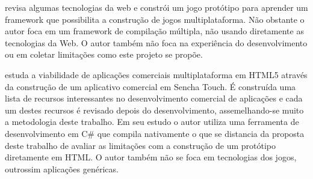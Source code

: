 \citet{crossPlatformMobileGameDevelopment} revisa algumas tecnologias
da web e constrói um jogo protótipo para aprender um framework que
possibilita a construção de jogos multiplataforma. Não obstante
o autor foca em um framework de compilação múltipla, não usando
diretamente as tecnologias da Web. O autor também não foca na experiência do
desenvolvimento ou em coletar limitações como este projeto se propõe.

\citet{viabilityBusinessApplications} estuda a viabilidade de
aplicações comerciais multiplataforma em HTML5 através da
construção de um aplicativo comercial em Sencha Touch. É construída
uma lista de recursos interessantes no desenvolvimento comercial
de aplicações e cada um destes recursos é revisado depois do
desenvolvimento, assemelhando-se muito a metodologia deste trabalho. Em
seu estudo o autor utiliza uma ferramenta de desenvolvimento em C\# que
compila nativamente o que se distancia da proposta deste trabalho de
avaliar as limitações com a construção de um protótipo diretamente
em HTML. O autor também não se foca em tecnologias dos jogos,
outrossim aplicações genéricas.



